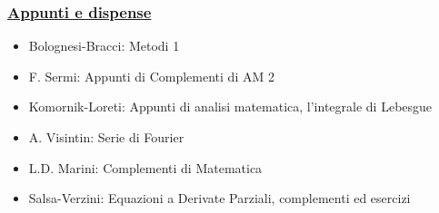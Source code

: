 \documentclass[a4paper,12pt]{report}
\begin{document}
\subsubsection{\underline{Appunti e dispense}}

\begin{itemize}
    \item Bolognesi-Bracci: Metodi 1
    \item F. Sermi: Appunti di Complementi di AM 2
    \item Komornik-Loreti: Appunti di analisi matematica, l'integrale di Lebesgue
    \item A. Visintin: Serie di Fourier
    \item L.D. Marini: Complementi di Matematica
    \item Salsa-Verzini: Equazioni a Derivate Parziali, complementi ed esercizi
\end{itemize}
\end{document}
